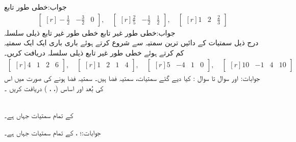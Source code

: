 جواب:خطی طور تابع
\begin{align*}
\begin{bmatrix*}[r] 
-\frac{1}{2}&-\frac{3}{2}&0
\end{bmatrix*},\quad \begin{bmatrix*}[r] 
\frac{2}{5}&-\frac{1}{2}&\frac{1}{2}
\end{bmatrix*},\quad \begin{bmatrix*}[r] 
1&2&\frac{2}{3}
\end{bmatrix*}
\end{align*}
جواب:خطی طور غیر تابع
\quad خطی طور غیر تابع ذیلی سلسلہ\\
درج ذیل سمتیات کے دائیں ترین سمتیہ  سے شروع کرتے ہوئے باری باری ایک ایک سمتیہ کم کرتے ہوئے خطی طور غیر تابع ذیلی سلسلہ دریافت کریں۔
\begin{align*}
\begin{bmatrix*}[r] 
4&1&2&6
\end{bmatrix*},\quad \begin{bmatrix*}[r] 
1&2&1&4
\end{bmatrix*},\quad \begin{bmatrix*}[r] 
5&-4&1&0
\end{bmatrix*},\quad \begin{bmatrix*}[r] 
10&-1&4&10
\end{bmatrix*}
\end{align*}
جوابات: اور 
سوال  تا سوال : کیا دیے گئے سمتیات، سمتیہ فضا ہیں۔ سمتیہ فضا ہونے کی صورت میں اس کی بُعد اور اساس  (، ،  ) دریافت کریں ۔

\\
 کے تمام سمتیات جہاں  ہے۔

جوابات:؛ ، 
 کے تمام سمتیات جہاں  ہے۔

